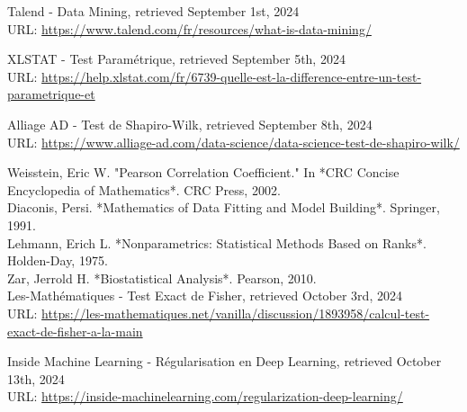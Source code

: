 \adjustmtc
\newpage
\renewcommand\bibname{Webographie}
\begin{thebibliography}{9}
\thispagestyle{MyStyle}

Talend - Data Mining, retrieved September 1st, 2024 \\ 
URL: \url{https://www.talend.com/fr/resources/what-is-data-mining/}

XLSTAT - Test Paramétrique, retrieved September 5th, 2024 \\ 
URL: \url{https://help.xlstat.com/fr/6739-quelle-est-la-difference-entre-un-test-parametrique-et}

Alliage AD - Test de Shapiro-Wilk, retrieved September 8th, 2024 \\ 
URL: \url{https://www.alliage-ad.com/data-science/data-science-test-de-shapiro-wilk/}

Weisstein, Eric W. "Pearson Correlation Coefficient." In *CRC Concise Encyclopedia of Mathematics*. CRC Press, 2002.\\

Diaconis, Persi. *Mathematics of Data Fitting and Model Building*. Springer, 1991.\\

Lehmann, Erich L. *Nonparametrics: Statistical Methods Based on Ranks*. Holden-Day, 1975.\\

Zar, Jerrold H. *Biostatistical Analysis*. Pearson, 2010.\\

Les-Mathématiques - Test Exact de Fisher, retrieved October 3rd, 2024 \\ 
URL: \url{https://les-mathematiques.net/vanilla/discussion/1893958/calcul-test-exact-de-fisher-a-la-main}

Inside Machine Learning - Régularisation en Deep Learning, retrieved October 13th, 2024 \\ 
URL: \url{https://inside-machinelearning.com/regularization-deep-learning/}


\end{thebibliography} 

